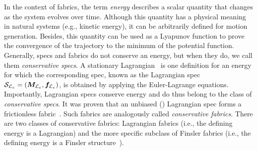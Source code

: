 In the context of \ac{fabrics}, the term \textit{energy} describes a scalar quantity that
changes as the system evolves over time.  Although this quantity has a physical meaning in
natural systems (e.g., kinetic energy), it can be arbitrarily defined for motion generation.
Besides, this quantity can be used as
a Lyapunov function to prove the convergence of the trajectory to the minimum of the potential
function.
Generally, specs and \ac{fabrics} do not conserve an energy, but when they do, we
call them \textit{conservative specs}.  A stationary Lagrangian~\cite[Definition
4.11]{Ratliff2020} is one definition for an energy for which the corresponding spec, known
as the Lagrangian spec $\mathcal{S}_{\mathcal{L}_e} = \left(\bm{M}_{\mathcal{L}_e},\bm{f}_{\mathcal{L}_e}\right)$, is obtained by applying the
Euler-Lagrange equations. Importantly, Lagrangian specs conserve energy and do thus belong
to the class of \textit{conservative specs}.  It was proven that an unbiased
(\cite[Definition~4.11]{Ratliff2020}) Lagrangian spec forms a frictionless
fabric~\cite[Proposition~4.18]{Ratliff2020}. Such
\ac{fabrics} are analogously called
\textit{conservative fabrics}.  There are two classes of conservative fabrics: Lagrangian
fabrics (i.e., the defining energy is a Lagrangian) and the more specific subclass of
Finsler fabrics (i.e., the
defining energy is a Finsler structure~\cite[Definition 5.4]{Ratliff2020}). 

